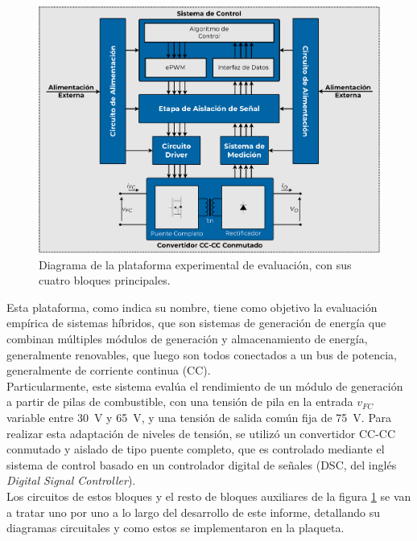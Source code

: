 \begin{figure}[h]
    \centering
    \includegraphics[scale=0.4]{Imagenes/Plataforma Detallada.pdf}
    \caption{Diagrama de la plataforma experimental de evaluación, con sus cuatro
    bloques principales.}
    \label{fig:plataforma}
\end{figure}

Esta plataforma, como indica su nombre, tiene como objetivo la evaluación empírica de sistemas híbridos, que son sistemas de generación de energía que combinan múltiples módulos de generación y almacenamiento de energía, generalmente renovables, que luego son todos conectados a un bus de potencia, generalmente de corriente continua (CC).\\

Particularmente, este sistema evalúa el rendimiento de un módulo de generación a partir de pilas de combustible, con una tensión de pila en la entrada $v_{FC}$ variable entre \SI[]{30}[]{\volt} y \SI[]{65}[]{\volt}, y una tensión de salida común fija de \SI[]{75}[]{\volt}. Para realizar esta adaptación de niveles de tensión, se utilizó un convertidor CC-CC conmutado y aislado de tipo puente completo, que es controlado mediante el sistema de control basado en un controlador digital de señales (DSC, del inglés \textit{Digital Signal Controller}).\\

Los circuitos de estos bloques y el resto de bloques auxiliares de la figura \ref{fig:plataforma} se van a tratar uno por uno a lo largo del desarrollo de este informe, detallando su diagramas circuitales y como estos se implementaron en la plaqueta.\\

\newpage